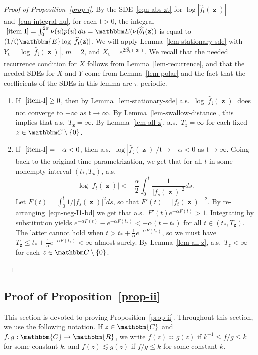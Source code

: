 \documentclass[11pt]{article}
\theoremstyle{plain}
\theoremstyle{definition}
\numberwithin{equation}{section}
\newcommand{\eqb}{\begin{equation}}
\newcommand{\eqe}{\end{equation}}
\newcommand{\BB}{\mathbbm}
\newcommand{\op}{\operatorname}
\newcommand{\rta}{\rightarrow}
\newcommand{\wh}{\widehat}
\newcommand{\zz}{{\op{\mathbf{z}}}}
\newcommand{\tz}{{\mathfrak t}}
\begin{document}
\begin{proof}[Proof of Proposition~\ref{prop-i}]
By the SDE~\eqref{eqn-abs-zt} for $\log |\wh f_\tz(\zz)|$ and~\eqref{eqn-integral-nu}, for each $\tz>0$, the integral $~\ref{item-I} = \int_0^{2\pi} \nu(u) p(u) \, du = \BB E(\nu(\wh\theta_\tz(\zz))$ is equal to $(1/\tz) \BB{E} \log |\wh f_\tz(\zz)|$. We will apply Lemma~\ref{lem-stationary-sde} with $Y_\tz = \log |\wh f_\tz(\zz)|$, $m=2$, and $X_\tz = e^{2 i \wh\theta_\tz(\zz)}$. We recall that the needed recurrence condition for $X$ follows from Lemma~\ref{lem-recurrence}, and that the needed SDEs for $X$ and $Y$ come from Lemma~\ref{lem-polar} and the fact that the coefficients of the SDEs in this lemma are $\pi$-periodic.

\begin{enumerate}[label=(\alph*)]
\item 
If $~\ref{item-I} \geq 0$, then by Lemma~\ref{lem-stationary-sde} a.s.\ $\log |\wh f_\tz(\zz)|$ does not converge to $-\infty$ as $\tz \rta \infty$.
By Lemma~\ref{lem-swallow-distance}, this implies that a.s.\ $T_{\zz} = \infty$. By Lemma~\ref{lem-all-z}, a.s.\ $T_z = \infty$ for each fixed $z\in\BB C\setminus \{0\}$. 
\item  
If $~\ref{item-I} = - \alpha  < 0$, then a.s.\ $\log |\wh f_\tz(\zz)|/\tz \rta - \alpha < 0$ as $\tz \rta \infty$.  Going back to the original time parametrization, we get that for all $t$ in some nonempty interval $(t_*,T_{\zz})$, a.s.\
\eqb \label{eqn-neg-I1-bd}
\log |f_{t}(\zz)| < - \frac{\alpha}{2} \int_0^{t} \frac{1}{|f_s(\zz)|^2} ds .
\eqe
Let $F(t) = \int_0^{t} 1/|f_s(\zz)|^2 ds$, so that $F'(t) = |f_t(\zz)|^{-2}$. 
By re-arranging~\eqref{eqn-neg-I1-bd} we get that a.s.\ $F'(t) e^{-\alpha F(t)} > 1$.  Integrating by substitution yields $e^{-\alpha F(t)} - e^{-\alpha F(t_*)}< - \alpha(t-t_*)$   for all $t \in (t_*,T_{\zz})$.   The latter cannot hold when
$t >  t_* + \frac{1}{\alpha}e^{-\alpha F(t_*)} $, so we must have $T_{\zz} \leq t_* + \frac{1}{\alpha}e^{-\alpha F(t_*)} < \infty$ almost surely.
By Lemma~\ref{lem-all-z}, a.s.\ $T_z < \infty$ for each $z \in \BB C\setminus \{0\}$.
\end{enumerate}
\end{proof}


\subsection{Proof of Proposition~\ref{prop-ii}}
\label{sec-prop-ii}

This section is devoted to proving Proposition~\ref{prop-ii}.
Throughout this section, we use the following notation.
If $z \in \BB{C}$ and $f,g:\BB{C} \rta \BB{R}$, we write $f(z) \asymp g(z)$  if $k^{-1} \leq f/g \leq k$ for some constant $k$, and $f(z) \lesssim g(z)$  if $f/g \leq k$ for some constant $k$. 
 
\end{document}
